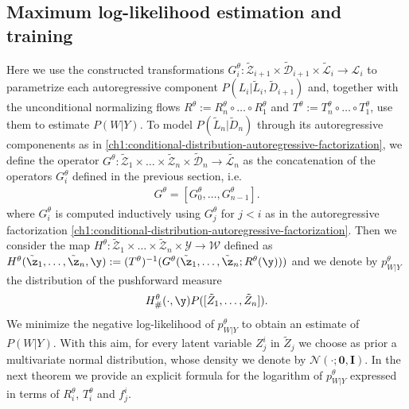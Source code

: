 \subsection{Maximum log-likelihood estimation and training}
Here we use the constructed transformations $G_i^\theta : \tilde{\mathcal{Z}}_{i+1} \times  \tilde{\mathcal{D}}_{i+1} \times  \tilde{\mathcal{L}}_{i} \rightarrow \mathcal{L}_{i}$ to parametrize each autoregressive component $P(L_i|\tilde{L}_{i},\tilde D_{i+1})$ and, together with the unconditional normalizing flows $R^{\theta} := R^\theta_n \circ \ldots \circ R^\theta_1$ and $T^{\theta}:= T^\theta_n \circ \ldots \circ T^\theta_1$, use them to estimate $P(W|Y)$. To model $ P(\tilde{L}_n| \tilde{D}_n)$ through its autoregressive componenents as in \eqref{ch1:conditional-distribution-autoregressive-factorization}, we define 
the operator $G^\theta : \tilde{\mathcal{Z}}_{1} \times \ldots \times \tilde{\mathcal{Z}}_{n} \times  \tilde{\mathcal{D}}_{n}  \rightarrow \tilde{\mathcal{L}_{n}}$ as the concatenation of the operators $G^\theta_i$ defined in the previous section, i.e. 
\begin{align}\label{ch1:eq:G}
    G^\theta = [G^\theta_0, \ldots, G^\theta_{n-1}].
\end{align}
where $G^\theta_i$ is computed inductively using $G^\theta_j$ for $j<i$ as in the autoregressive factorization \eqref{ch1:conditional-distribution-autoregressive-factorization}.
Then we consider the map $H^\theta :  \tilde{\mathcal{Z}}_{1} \times \ldots \times \tilde{\mathcal{Z}}_{n} \times \mathcal{Y}\rightarrow \mathcal{W}$ defined as  $H^\theta(\tilde \z_1, \ldots, \tilde \z_n, \y):= (T^\theta)^{-1}( G^\theta(\tilde \z_1, \ldots, \tilde \z_n ; R^\theta(\y)))$ and we denote by $p^\theta_{W|Y}$ the distribution of the pushforward measure
\begin{align}
    H^\theta_\#(\cdot, \y) P([\tilde Z_{1}, \ldots, \tilde Z_{n}]).
\end{align}
We minimize the negative log-likelihood of $p^\theta_{W|Y}$ to obtain an estimate of $P(W|Y)$.
With this aim, for every latent variable $Z_j^i$ in $\tilde Z_j$ we choose as prior a multivariate normal distribution, whose density we denote by $\mathcal{N}(\cdot; \textbf{0}, \textbf{I})$.
In the next theorem we provide an explicit formula for the logarithm of $p^\theta_{W|Y}$ expressed in terms of $R^\theta_i$, $T^\theta_i$ and $f^i_j$.

